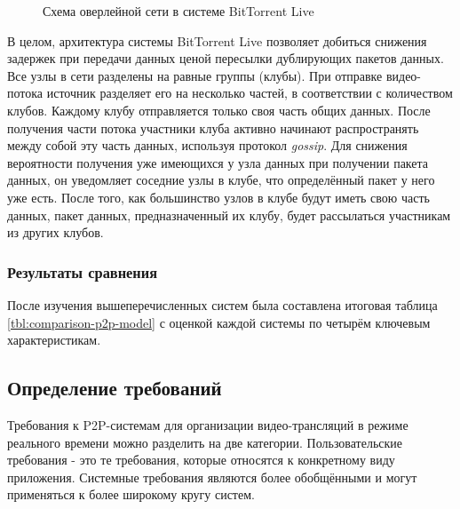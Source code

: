 		\begin{figure}[h]
			\caption{Схема оверлейной сети в системе BitTorrent Live}
			\label{img:btlive-overlay}
		\end{figure}

		В целом, архитектура системы BitTorrent Live позволяет добиться снижения задержек при передачи данных ценой
		пересылки дублирующих пакетов данных. Все узлы в сети разделены на равные группы (клубы). При отправке
		видео-потока источник разделяет его на несколько частей, в соответствии с количеством клубов. Каждому клубу
		отправляется только своя часть общих данных. После получения части потока участники клуба активно начинают
		распространять между собой эту часть данных, используя протокол \textit{gossip}. Для снижения вероятности
		получения уже имеющихся у узла данных при получении пакета данных, он уведомляет соседние узлы в клубе, что
		определённый пакет у него уже есть. После того, как большинство узлов в клубе будут иметь свою часть данных,
		пакет данных, предназначенный их клубу, будет рассылаться участникам из других клубов.

		\subsubsection{Результаты сравнения}
		После изучения вышеперечисленных систем была составлена итоговая таблица \ref{tbl:comparison-p2p-model} с
		оценкой каждой системы по четырём ключевым характеристикам.

		

	\subsection{Определение требований}
	Требования к P2P-системам для организации видео-трансляций в режиме реального времени можно разделить на две
	категории. Пользовательские требования - это те требования, которые относятся к конкретному виду приложения.
	Системные требования являются более обобщёнными и могут применяться к более широкому кругу систем.

